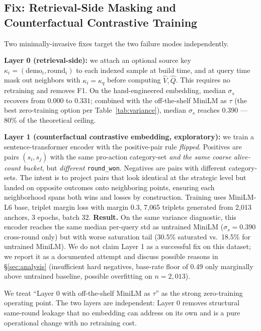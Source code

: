 \documentclass{article}
\begin{document}
\subsection{Fix: Retrieval-Side Masking and Counterfactual Contrastive Training}
\label{sec:fix}

Two minimally-invasive fixes target the two failure modes independently.

\textbf{Layer 0 (retrieval-side):} we attach an optional source key $\kappa_i = (\text{demo}_i, \text{round}_i)$ to each indexed sample at build time, and at query time mask out neighbors with $\kappa_i = \kappa_q$ before computing $\hat{V}, \hat{Q}$. This requires no retraining and removes F1. On the hand-engineered embedding, median $\sigma_s$ recovers from $0.000$ to $0.331$; combined with the off-the-shelf MiniLM as $\tau$ (the best zero-training option per Table~\ref{tab:variance}), median $\sigma_s$ reaches $0.390$ --- 80\% of the theoretical ceiling.

\textbf{Layer 1 (counterfactual contrastive embedding, exploratory):} we train a sentence-transformer encoder with the positive-pair rule \emph{flipped}. Positives are pairs $(s_i, s_j)$ with the same pro-action category-set \emph{and the same coarse alive-count bucket}, but \emph{different} \texttt{round\_won}. Negatives are pairs with different category-sets. The intent is to project pairs that look identical at the strategic level but landed on opposite outcomes onto neighboring points, ensuring each neighborhood spans both wins and losses by construction. Training uses MiniLM-L6 base, triplet margin loss with margin 0.3, 7{,}065 triplets generated from 2{,}013 anchors, 3 epochs, batch 32. \textbf{Result.} On the same variance diagnostic, this encoder reaches the same median per-query std as untrained MiniLM ($\sigma_s = 0.390$ cross-round only) but with worse saturation tail (30.5\% saturated vs.\ 18.5\% for untrained MiniLM). We do not claim Layer 1 as a successful fix on this dataset; we report it as a documented attempt and discuss possible reasons in \S\ref{sec:analysis} (insufficient hard negatives, base-rate floor of 0.49 only marginally above untrained baseline, possible overfitting on $n{=}2{,}013$).

We treat ``Layer 0 with off-the-shelf MiniLM as $\tau$'' as the strong zero-training operating point. The two layers are independent: Layer 0 removes structural same-round leakage that no embedding can address on its own and is a pure operational change with no retraining cost.
\end{document}
